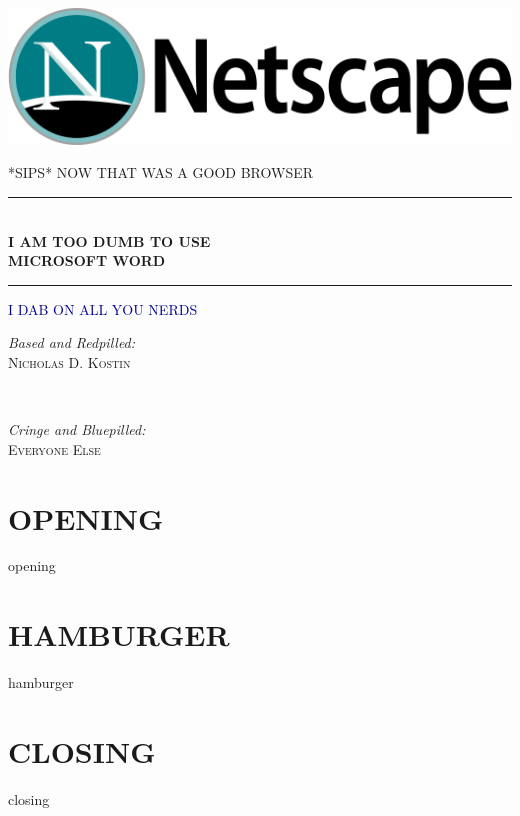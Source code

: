 \documentclass[twoside]{report}
\numberwithin{equation}{section}
\begin{document}
\begin{titlepage}

\centering

\includegraphics[width=\textwidth]{images/netscapenavigator.png}

\vspace{2.0em}

\textsc{\large {*SIPS* NOW THAT WAS A GOOD BROWSER}}

\vspace{2.0em}

\rule{\textwidth}{1pt}\\[0.2em]
{\huge {\textbf{I AM TOO DUMB TO USE \\[0.2cm] MICROSOFT WORD}}}\\[0.2em]
\rule{\textwidth}{1pt}

\vspace{2.0em}

\textsc{\huge \textcolor{DARKBLUE}{\textsc{I DAB ON ALL YOU NERDS}}}

\vspace{2.6em}

\begin{minipage}{0.4\textwidth}
\begin{flushleft} \large
\emph{Based and Redpilled:} \\
\textsc{Nicholas D. Kostin} \\
\end{flushleft}
\end{minipage}
~
\begin{minipage}{0.4\textwidth}
\begin{flushright} \large
\emph{Cringe and Bluepilled:} \\
\textsc{Everyone Else}
\end{flushright}
\end{minipage}

\vfill

\end{titlepage}

\newpage

\tableofcontents

\chapter{OPENING}
\newpage
{opening}

\newpage

\chapter{HAMBURGER}
\newpage
{hamburger}

\newpage

\chapter{CLOSING}
\newpage
{closing}
\end{document}

